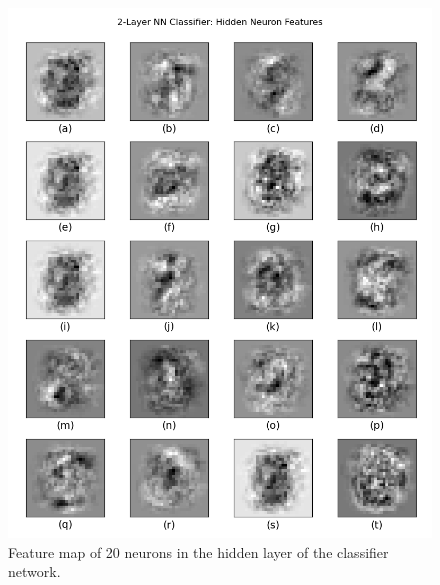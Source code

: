 \documentclass[11pt,titlepage]{article}
\begin{document}
\begin{figure}[htb]
	\centering
	\begin{minipage}{0.45\textwidth}
		\includegraphics[width=\linewidth]{img/h3p1_feature}
		\caption{Feature map of 20 neurons in the hidden layer of the classifier network.}
		\label{fig:classifier_feature}
	\end{minipage}
	\hfill
	\begin{minipage}{0.45\linewidth}

\end{minipage}
\end{figure}
\end{document}
